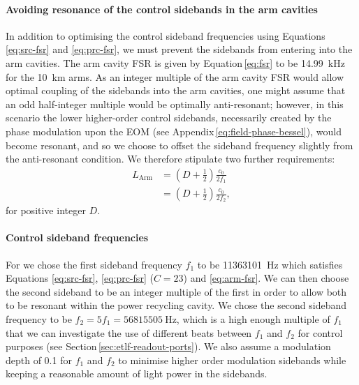 \paragraph{Avoiding resonance of the control sidebands in the arm cavities}
In addition to optimising the control sideband frequencies using Equations \ref{eq:src-fsr} and \ref{eq:prc-fsr}, we must prevent the sidebands from entering into the arm cavities. The arm cavity \gls{FSR} is given by Equation\,\ref{eq:fsr} to be \SI{14.99}{\kilo\hertz} for the \SI{10}{\kilo\meter} arms. As an integer multiple of the arm cavity \gls{FSR} would allow optimal coupling of the sidebands into the arm cavities, one might assume that an odd half-integer multiple would be optimally anti-resonant; however, in this scenario the lower higher-order control sidebands, necessarily created by the phase modulation upon the \gls{EOM} (see Appendix\,\ref{eq:field-phase-bessel}), would become resonant, and so we choose to offset the sideband frequency slightly from the anti-resonant condition. We therefore stipulate two further requirements:
\begin{equation}
  \label{eq:arm-fsr}
  \begin{split}
    L_{\text{Arm}} &= \left(D + \frac{1}{2} \right) \frac{c_0}{2 f_1} \\
                   &= \left(D + \frac{1}{2} \right) \frac{c_0}{2 f_2},
  \end{split}
\end{equation}
for positive integer $D$.

\paragraph{Control sideband frequencies}
For \ETLF{} we chose the first sideband frequency $f_1$ to be \SI{11363101}{\hertz} which satisfies Equations \ref{eq:src-fsr}, \ref{eq:prc-fsr} ($C = 23$) and \ref{eq:arm-fsr}. We can then choose the second sideband to be an integer multiple of the first in order to allow both to be resonant within the power recycling cavity. We chose the second sideband frequency to be $f_2 = 5f_1 = \SI{56815505}{\hertz}$, which is a high enough multiple of $f_1$ that we can investigate the use of different beats between $f_1$ and $f_2$ for control purposes (see Section\,\ref{sec:etlf-readout-ports}). We also assume a modulation depth of \num{0.1} for $f_1$ and $f_2$ to minimise higher order modulation sidebands while keeping a reasonable amount of light power in the sidebands.


